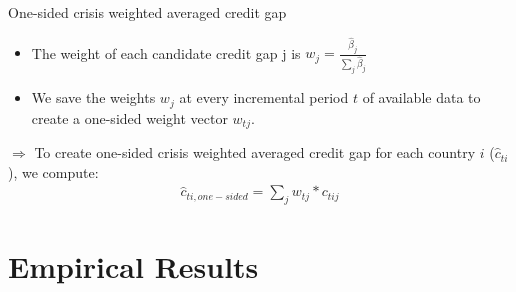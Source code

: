 \documentclass[
  ignorenonframetext,
]{beamer}
\begin{document}
\begin{frame}{One-sided crisis weighted averaged credit gap}
\protect\hypertarget{one-sided-crisis-weighted-averaged-credit-gap}{}
\begin{itemize}
\item
  The weight of each candidate credit gap j is
  \(w_j = \frac{\hat{\beta}_j}{\sum\nolimits_j\hat{\beta}_j}\)
\item
  We save the weights \(w_j\) at every incremental period \(t\) of
  available data to create a one-sided weight vector \(w_{tj}\).
\end{itemize}

\(\Rightarrow\) To create one-sided crisis weighted averaged credit gap
for each country \(i\) (\(\hat{c}_{ti}\)), we compute: \begin{align}
\hat{c}_{ti,one-sided} = \sum\nolimits_{j} w_{tj} * c_{tij}
\end{align}
\end{frame}

\hypertarget{empirical-results}{%
\section{Empirical Results}\label{empirical-results}}
\end{document}
